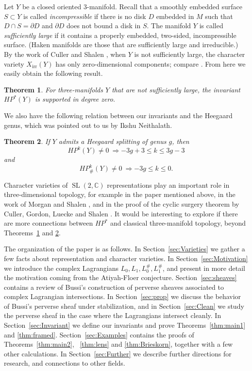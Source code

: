 \documentclass [11pt]{amsart}
\newtheorem {theorem}{Theorem}[section]
\theoremstyle{remark}
\def\cc {{\mathbb{C}}}
\def\del{\partial}
\def\HP{\mathit{HP}}
\def\sl {{\operatorname{SL}(2, \cc)}}
\def\Char {X}
\def\CharIrr {\Char_{\operatorname{irr}}}
\begin{document}
Let $Y$ be a closed oriented $3$-manifold. Recall that a smoothly embedded surface $S \subset Y$ is called {\em incompressible} if there is no disk $D$ embedded in $M$ such that $D \cap S = \del D$ and $\del D$ does not bound a disk in $S$. The manifold $Y$ is called {\em sufficiently large} if it contains a properly embedded, two-sided, incompressible surface. (Haken manifolds are those that are sufficiently large and irreducible.) By the work of Culler and Shalen \cite{CullerShalen}, when $Y$ is not sufficiently large, the character variety $\CharIrr(Y)$ has only zero-dimensional components; compare \cite[Proposition 3.1]{Curtis}. From here we easily obtain the following result.

\begin{theorem}
\label{thm:NSL}
For three-manifolds $Y$ that are not sufficiently large, the invariant $\HP^*(Y)$ is supported in degree zero.
\end{theorem}

We also have the following relation between our invariants and the Heegaard genus, which was pointed out to us by  Ikshu Neithalath.

\begin{theorem}
\label{thm:ikshu}
If $Y$ admits a Heegaard splitting of genus $g$, then
$$ \HP^k(Y) \neq 0 \ \Rightarrow -3g+3 \leq k  \leq 3g-3$$
and
$$ \HP^k_{\#}(Y) \neq 0 \ \Rightarrow -3g \leq  k \leq 0.$$
\end{theorem}

Character varieties of $\sl$ representations play an important role in three-dimensional topology, for example in the paper \cite{CullerShalen} mentioned above, in the work of Morgan and Shalen \cite{MorganShalen1, MorganShalen2, MorganShalen3}, and in the proof of the cyclic surgery theorem by Culler, Gordon, Luecke and Shalen \cite{CGLS}. It would be interesting to explore if there are more connections between $\HP^*$ and classical three-manifold topology, beyond Theorems~\ref{thm:NSL} and \ref{thm:ikshu}.

The organization of the paper is as follows. In Section~\ref{sec:Varieties} we gather a few facts about representation and character varieties. In Section~\ref{sec:Motivation} we introduce the complex  Lagrangians $L_0, L_1, L_0^{\#}, L_1^{\#}$, and present in more detail the motivation coming from the Atiyah-Floer conjecture.  Section~\ref{sec:sheaves} contains a review of Bussi's construction of perverse sheaves associated to complex Lagrangian intersections. In Section~\ref{sec:prop} we discuss the behavior of Bussi's perverse sheaf under stabilization, and in Section~\ref{sec:Clean} we study the perverse sheaf in the case where the Lagrangians intersect cleanly. In Section~\ref{sec:Invariant} we define our invariants and prove Theorems~\ref{thm:main1} and \ref{thm:framed}.  Section~\ref{sec:Examples} contains the proofs of Theorems~\ref{thm:main2}, ~\ref{thm:lens} and \ref{thm:Brieskorn}, together with a few other calculations. In Section~\ref{sec:Further} we describe further directions for research, and connections to other fields.
\end{document}
